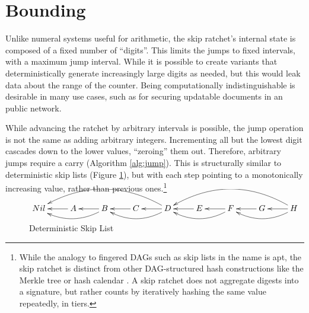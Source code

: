 \documentclass{article}
\begin{document}
    \section{Bounding}
    
    Unlike numeral systems useful for arithmetic, the skip ratchet's internal state is composed of a fixed number of ``digits''. This limits the jumps to fixed intervals, with a maximum jump interval. While it is possible to create variants that deterministically generate increasingly large digits as needed, but this would leak data about the range of the counter. Being computationally indistinguishable is desirable in many use cases, such as for securing updatable documents in an public network.
    
    While advancing the ratchet by arbitrary intervals is possible, the jump operation is not the same as adding arbitrary integers. Incrementing all but the lowest digit cascades down to the lower values, ``zeroing'' them out. Therefore, arbitrary jumps require a carry (Algorithm \ref{alg:jump}). This is structurally similar to deterministic skip lists \cite{deterministic-skip-lists} (Figure \ref{fig:skip-list}), but with each step pointing to a monotonically increasing value, rather than previous ones.\footnote{While the analogy to fingered DAGs such as skip lists in the name is apt, the skip ratchet is distinct from other DAG-structured hash constructions like the Merkle tree \cite{merkle-tree} or hash calendar \cite{distributed-hash-calendar}. A skip ratchet does not aggregate digests into a signature, but rather counts by iteratively hashing the same value repeatedly, in tiers.} \\
 
	\begin{figure}[h]
		\centering
		
		$\xymatrix{
			  Nil
			& A \ar[l]
			& B \ar[l] , \ar@/^1pc/[ll]
			& C \ar[l]
			& D \ar[l] , \ar@/^1pc/[ll] , \ar@/_2pc/[llll]
			& E \ar[l]
			& F \ar[l] , \ar@/^1pc/[ll]
			& G \ar[l]
			& H \ar[l] , \ar@/^1pc/[ll] , \ar@/_2pc/[llll]
		}$
	
		\caption{Deterministic Skip List}
		\label{fig:skip-list}
	\end{figure}
\end{document}
